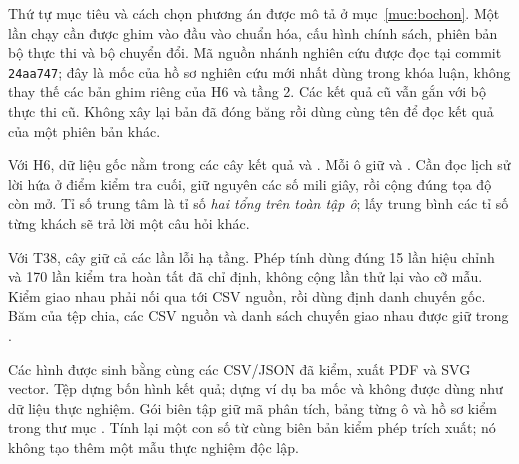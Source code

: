 Thứ tự mục tiêu và cách chọn phương án được mô tả ở mục~\ref{muc:bochon}.
Một lần chạy cần được ghim vào đầu vào chuẩn hóa, cấu hình chính sách, phiên
bản bộ thực thi và bộ chuyển đổi. Mã nguồn nhánh nghiên cứu được đọc tại
commit \texttt{24aa747}; đây là mốc của hồ sơ nghiên cứu mới nhất dùng trong
khóa luận, không thay thế các bản ghim riêng của H6 và tầng 2. Các kết quả
cũ vẫn gắn với bộ thực thi cũ. Không xây lại bản đã đóng băng rồi dùng cùng
tên để đọc kết quả của một phiên bản khác.

Với H6, dữ liệu gốc nằm trong các cây kết quả
 và . Mỗi ô giữ
 và . Cần đọc lịch sử lời hứa
ở điểm kiểm tra cuối, giữ nguyên các số mili giây, rồi cộng đúng tọa độ
còn mở. Tỉ số trung tâm là tỉ số \emph{hai tổng trên toàn tập ô}; lấy trung
bình các tỉ số từng khách sẽ trả lời một câu hỏi khác.

Với T38, cây  giữ cả các lần lỗi hạ tầng. Phép
tính dùng đúng 15 lần hiệu chỉnh và 170 lần kiểm tra hoàn tất đã chỉ định,
không cộng lần thử lại vào cỡ mẫu. Kiểm giao nhau phải nối
 qua  tới
CSV nguồn, rồi dùng định danh chuyến gốc. Băm của tệp chia, các CSV nguồn
và danh sách chuyến giao nhau được giữ trong
.

Các hình được sinh bằng cùng các CSV/JSON đã kiểm, xuất PDF và SVG vector.
Tệp  dựng bốn hình kết quả;
 dựng ví dụ ba mốc và không được dùng như dữ
liệu thực nghiệm. Gói biên tập giữ mã phân tích, bảng từng ô và hồ sơ kiểm
trong thư mục . Tính lại một con số từ cùng biên bản kiểm phép
trích xuất; nó không tạo thêm một mẫu thực nghiệm độc lập.
